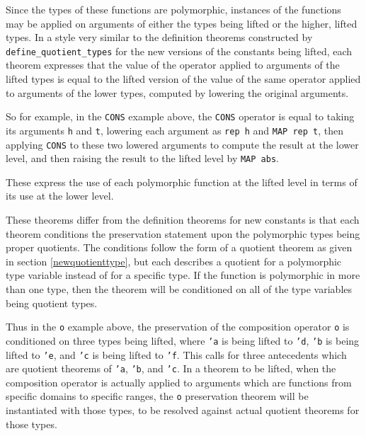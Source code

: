 \documentclass[envcountsame,runningheads]{llncs}
\begin{document}


Since the types of
these functions are polymorphic, instances of the functions may be applied
on arguments of either the types being lifted or the higher, lifted types.
In a style very similar to the definition theorems constructed
by {\tt define\_quotient\_types} for the new versions of the
constants being lifted,
each theorem expresses that the value of
the operator applied to arguments of the lifted types
is equal to the lifted version of the value of the same operator
applied to arguments of the lower types,
computed by lowering the original arguments.

So for example, in the {\tt CONS} example above,
the {\tt CONS} operator is equal to taking its arguments
{\tt h} and {\tt t}, lowering each argument as {\tt rep h} and {\tt MAP rep t},
then applying {\tt CONS} to these two lowered arguments to compute the
result at the lower level, and then raising the result to the lifted level
by {\tt MAP abs}.

These
express the use of each polymorphic function at the
lifted level in terms of its use at the lower level.

These theorems differ from
the definition theorems for new constants
is that each theorem conditions the preservation statement
upon the polymorphic types being
proper quotients.  The conditions follow the form
of a quotient theorem as given in section \ref{newquotienttype},
but each describes a quotient for a polymorphic type variable
instead of for a specific type.  If the function is polymorphic in more
than one type, then the theorem will be conditioned on all of the
type variables being quotient types.

Thus in the {\tt o} example above, the preservation
of the composition operator {\tt o}
is conditioned on three types being lifted,
where {\tt 'a} is being lifted to {\tt 'd},
{\tt 'b} is being lifted to {\tt 'e}, and
{\tt 'c} is being lifted to {\tt 'f}.
This calls for three antecedents which are quotient theorems of {\tt 'a},
{\tt 'b}, and {\tt 'c}.
In a theorem to be lifted, when
the composition operator is actually applied
to arguments which are functions from specific domains
to specific ranges, the {\tt o} preservation theorem will be
instantiated with those types,
to be resolved against actual quotient theorems for those types.
\end{document}
